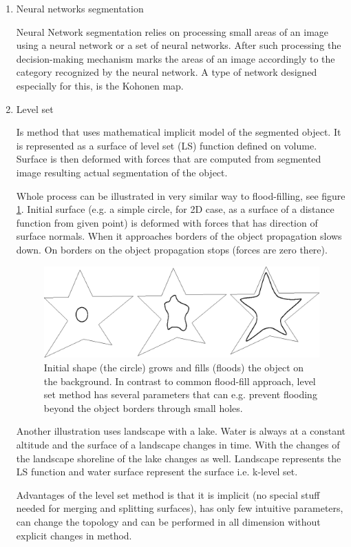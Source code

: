 \begin{enumerate}
  \item  Neural networks segmentation

  Neural Network segmentation relies on processing small areas of an image using a neural network or a set of neural networks.
After such processing the decision-making mechanism marks the areas of an image accordingly to the category recognized by the neural network.
A type of network designed especially for this, is the Kohonen map.

  \item Level set

Is method that uses mathematical implicit model of the segmented object.
It is represented as a surface of level set (LS) function defined on volume.
Surface is then deformed with forces that are computed from segmented image resulting actual segmentation of the object.

Whole process can be illustrated in very similar way to flood-filling, see figure \ref{fg:flooding}.
Initial surface (e.g. a simple circle, for 2D case, as a surface of a distance function from given point) is deformed with forces that has direction of surface normals.
When it approaches borders of the object propagation slows down.
On borders on the object propagation stops (forces are zero there).

\begin{figure}
    \centering
    \includegraphics[width=12cm]{data/flooding}
    \caption[Flooding an object]{Initial shape (the circle) grows and fills (floods) the object on the background. In contrast to common flood-fill approach, level set method has several parameters that can e.g. prevent flooding beyond the object borders through small holes.}
    \label{fg:flooding}
\end{figure}

\par
Another illustration uses landscape with a lake.
Water is always at a constant altitude and the surface of a landscape changes in time.
With the changes of the landscape shoreline of the lake changes as well.
Landscape represents the LS function and water surface represent the surface i.e. k-level set.

\par
Advantages of the level set method is that it is implicit (no special stuff needed for merging and splitting surfaces), has only few intuitive parameters, can change the topology and can be performed in all dimension without explicit changes in method.

\end{enumerate}

